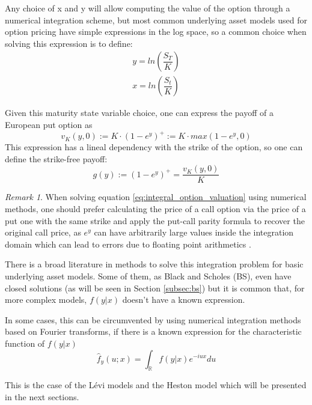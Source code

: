 \documentclass[12,twoside]{mammeTFM}
\theoremstyle{definition}
\theoremstyle{remark}
\newtheorem{remark}[thm]{Remark}
\newcommand{\R}{\ensuremath{\mathbb{R}}}
\begin{document}
Any choice of x and y will allow computing the value of the option through a numerical integration scheme, but most common underlying asset models used for option pricing have simple expressions in the log space, so a common choice when solving this expression is to define:
\begin{align}
\label{eq:y}
y = ln \left(\dfrac{S_T}{K} \right) \\
\label{eq:x}
x = ln \left(\dfrac{S_t}{K} \right)
\end{align}

Given this maturity state variable choice, one can express the payoff of a European put option as
\begin{equation} \label{eq:european_payoff}
v_{K}(y, 0) := K \cdot (1 - e^y)^{+} := K \cdot max(1 - e^y, 0)
\end{equation}
This expression has a lineal dependency with the strike of the option, so one can define the strike-free payoff:
\begin{equation}
g(y) := (1 - e^y)^{+} = \dfrac{v_{K}(y, 0)}{K}
\end{equation}

\begin{remark}
When solving equation \ref{eq:integral_option_valuation} using numerical methods, one should prefer calculating the price of a call option via the price of a put one with the same strike and apply the put-call parity formula to recover the original call price, as $e^y$ can have arbitrarily large values inside the integration domain which can lead to errors due to floating point arithmetics \cite{mar17}.
\end{remark}

There is a broad literature in methods to solve this integration problem for basic underlying asset models. Some of them, as Black and Scholes (BS), even have closed solutions (as will be seen in Section \ref{subsec:bs}) but it is common that, for more complex models, $f(y|x)$ doesn't have a known expression.

In some cases, this can be circumvented by using numerical integration methods based on Fourier transforms, if there is a known expression for the characteristic function of $f(y|x)$
\begin{equation}
\hat{f}_y(u;x) = \int_{\R} f(y | x) e^{-iux} du
\end{equation}

This is the case of the L\'evi models and the Heston model which will be presented in the next sections.
\end{document}
